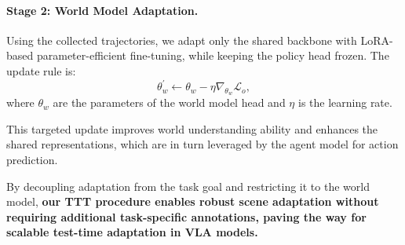 \paragraph{Stage 2: World Model Adaptation.}
Using the collected trajectories, we adapt only the shared backbone with LoRA-based parameter-efficient fine-tuning, while keeping the policy head frozen.  
The update rule is:
\[
\theta^\prime_w \leftarrow \theta_w - \eta \nabla_{\theta_w} \mathcal{L}_o,
\]
where $\theta_w$ are the parameters of the world model head and $\eta$ is the learning rate.

This targeted update improves world understanding ability and enhances the shared representations, which are in turn leveraged by the agent model for action prediction.

By decoupling adaptation from the task goal and restricting it to the world model, \textbf{our TTT procedure enables robust scene adaptation without requiring additional task-specific annotations, paving the way for scalable test-time adaptation in VLA models.}
